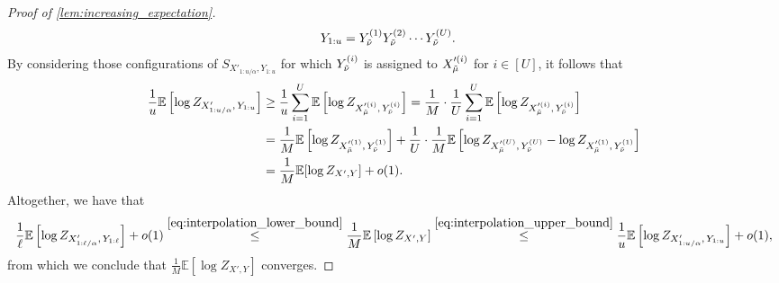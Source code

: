 \documentclass[11pt]{amsart}
\numberwithin{equation}{section}
\numberwithin{equation}{section}
\newcommand{\1}{\mathbbm{1}}
\newcommand{\E}{\mathbb{E}}
\theoremstyle{definition}
\begin{document}
\begin{proof}[Proof of \cref{lem:increasing_expectation}]
\begin{align*}
        & Y_{1:u} = Y_{\Tilde{\nu}}^{(1)}Y_{\Tilde{\nu}}^{(2)}\cdots Y_{\Tilde{\nu}}^{(U)}.
    \end{align*}
    By considering those configurations of $S_{X'_{1:u/\alpha},Y_{1:u}}$ for which $Y_{\Tilde{\nu}}^{(i)}$ is assigned to $X_{\Tilde{\mu}}'^{(i)}$ for $i \in [U]$, it follows that
    \begin{align}
        \frac{1}{u} \E\left[ \log Z_{X'_{1:u/\alpha},\,Y_{1:u}} \right] & \geq \frac{1}{u}\sum_{i=1}^U \E\left[ \log Z_{X_{\Tilde{\mu}}'^{(i)},\, Y_{\Tilde{\nu}}^{(i)}} \right] = \frac{1}{M} \cdot \frac{1}{U}\sum_{i=1}^U \E\left[ \log Z_{X_{\Tilde{\mu}}'^{(i)},\, Y_{\Tilde{\nu}}^{(i)}} \right] \nonumber \\
        & = \frac{1}{M}\E\left[ \log Z_{X_{\Tilde{\mu}}'^{(1)},\, Y_{\Tilde{\nu}}^{(1)}} \right] + \frac{1}{U} \cdot \frac{1}{M} \E\left[ \log Z_{X_{\Tilde{\mu}}'^{(U)},\, Y_{\Tilde{\nu}}^{(U)}} - \log Z_{X_{\Tilde{\mu}}'^{(1)},\, Y_{\Tilde{\nu}}^{(1)}} \right] \nonumber  \\
        & = \frac{1}{M}\E[\log Z_{X', Y}] + o(1). \label{eq:interpolation_upper_bound}
    \end{align}
    Altogether, we have that
    \begin{align*}
        \frac{1}{\ell} \E\left[\log Z_{X'_{1:\ell/\alpha},\,Y_{1:\ell}}\right] + o(1) \stackrel{\eqref{eq:interpolation_lower_bound}}{\leq} \frac{1}{M}\E\left[ \log Z_{X',Y} \right] \stackrel{\eqref{eq:interpolation_upper_bound} }{\leq} \frac{1}{u} \E\left[\log Z_{X'_{1:u/\alpha},\,Y_{1:u}}\right] + o(1),
    \end{align*}
    from which we conclude that $\frac{1}{M}\E[\log Z_{X',Y}]$ converges.
\end{proof}
\end{document}
